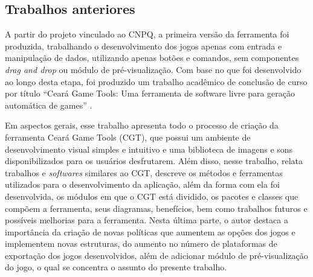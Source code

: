 \documentclass[12pt,oneside,openright,a4paper,english,brazil,sumario=tradicional]{abntex2}
\begin{document}
\subsection{Trabalhos anteriores}
A partir do projeto vinculado ao CNPQ, a primeira versão da ferramenta foi produzida, trabalhando o desenvolvimento dos jogos apenas com entrada e manipulação de dados, utilizando apenas botões e comandos, sem componentes \emph{drag and drop} ou módulo de pré-visualização. Com base no que foi desenvolvido ao longo desta etapa, foi produzido um trabalho acadêmico de conclusão de curso por título “Ceará Game Tools: Uma ferramenta de software livre para geração automática de games” \cite{monografia:aquino}.

Em aspectos gerais, esse trabalho apresenta todo o processo de criação da ferramenta Ceará Game Tools (CGT), que possui um ambiente de desenvolvimento visual simples e intuitivo e uma biblioteca de imagens e sons disponibilizados para os usuários desfrutarem. Além disso, nesse trabalho, relata trabalhos e \emph{softwares} similares ao CGT, descreve os métodos e ferramentas utilizados para o desenvolvimento da aplicação, além da forma com ela foi desenvolvida, os módulos em que o CGT está dividido, os pacotes e classes que compõem a ferramenta, seus diagramas, benefícios, bem como trabalhos futuros e possíveis melhorias para a ferramenta. Nesta última parte, o autor destaca a importância da criação de novas políticas que aumentem as opções dos jogos e implementem novas estruturas, do aumento no número de plataformas de exportação dos jogos desenvolvidos, além de adicionar módulo de pré-visualização do jogo, o qual se concentra o assunto do presente trabalho.
\end{document}
